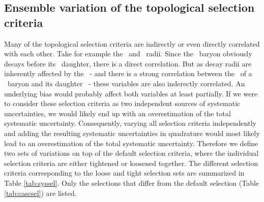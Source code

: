   \subsection{Ensemble variation of the topological selection criteria}
    Many of the topological selection criteria are indirectly or even directly correlated with each other. Take for example the \Xi\ and \Lambda\ radii. Since the \Xi\ baryon obviously decays before its \Lambda\ daughter, there is a direct correlation. But as decay radii are inherently affected by the \pt\ - and there is a strong correlation between the \pt\ of a \Xi\ baryon and its daughter \pt\ - these variables are also inderectly correlated. An underlying bias would probably affect both variables at least partially. If we were to consider these selection criteria as two independent sources of systematic uncertainties, we would likely end up with an overestimation of the total systematic uncertainty. Consequently, varying all selection criteria independently and adding the resulting systematic uncertainties in quadrature would most likely lead to an overestimation of the total systematic uncertainty. 
    Therefore we define two sets of variations on top of the default selection criteria, where the individual selection criteria are either tightened or loosened together. The different selection criteria corresponding to the loose and tight selection sets are summarized in Table \ref{tab:syssel}. Only the selections that differ from the default selection (Table \ref{tab:cascsel}) are listed. 

